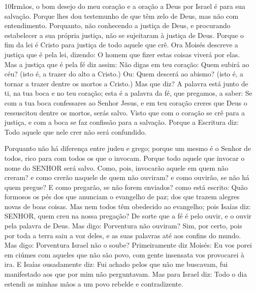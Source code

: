 \lettrine{10} Irmãos, o bom desejo do meu coração e a oração a
Deus por Israel é para sua salvação. Porque lhes dou testemunho
de que têm zelo de Deus, mas não com entendimento. Porquanto,
não conhecendo a justiça de Deus, e procurando estabelecer a sua
própria justiça, não se sujeitaram à justiça de Deus. Porque o
fim da lei é Cristo para justiça de todo aquele que crê. Ora
Moisés descreve a justiça que é pela lei, dizendo: O homem que fizer
estas coisas viverá por elas. Mas a justiça que é pela fé diz
assim: Não digas em teu coração: Quem subirá ao céu? (isto é, a
trazer do alto a Cristo.) Ou: Quem descerá ao abismo? (isto é, a
tornar a trazer dentre os mortos a Cristo.) Mas que diz? A
palavra está junto de ti, na tua boca e no teu coração; esta é a
palavra da fé, que pregamos, a saber: Se com a tua boca
confessares ao Senhor Jesus, e em teu coração creres que Deus o
ressuscitou dentre os mortos, serás salvo. Visto que com o
coração se crê para a justiça, e com a boca se faz confissão para a
salvação. Porque a Escritura diz: Todo aquele que nele crer
não será confundido.

Porquanto não há diferença entre judeu e grego; porque um mesmo é
o Senhor de todos, rico para com todos os que o invocam.
Porque todo aquele que invocar o nome do SENHOR será salvo.
Como, pois, invocarão aquele em quem não creram? e como
crerão naquele de quem não ouviram? e como ouvirão, se não há quem
pregue? E como pregarão, se não forem enviados? como está
escrito: Quão formosos os pés dos que anunciam o evangelho de paz;
dos que trazem alegres novas de boas coisas. Mas nem todos
têm obedecido ao evangelho; pois Isaías diz: SENHOR, quem creu na
nossa pregação? De sorte que a fé é pelo ouvir, e o ouvir
pela palavra de Deus. Mas digo: Porventura não ouviram? Sim,
por certo, pois por toda a terra saiu a voz deles, e as suas
palavras até aos confins do mundo. Mas digo: Porventura
Israel não o soube? Primeiramente diz Moisés: Eu vos porei em ciúmes
com aqueles que não são povo, com gente insensata vos provocarei à
ira. E Isaías ousadamente diz: Fui achado pelos que não me
buscavam, fui manifestado aos que por mim não perguntavam.
Mas para Israel diz: Todo o dia estendi as minhas mãos a um
povo rebelde e contradizente.

\medskip

